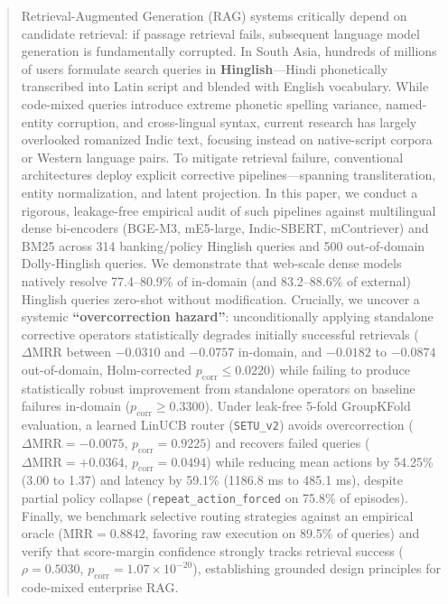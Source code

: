 \documentclass[conference]{IEEEtran}
\begin{document}
\begin{abstract}
Retrieval-Augmented Generation (RAG) systems critically depend on candidate retrieval: if passage retrieval fails, subsequent language model generation is fundamentally corrupted. In South Asia, hundreds of millions of users formulate search queries in \textbf{Hinglish}---Hindi phonetically transcribed into Latin script and blended with English vocabulary. While code-mixed queries introduce extreme phonetic spelling variance, named-entity corruption, and cross-lingual syntax, current research has largely overlooked romanized Indic text, focusing instead on native-script corpora or Western language pairs. To mitigate retrieval failure, conventional architectures deploy explicit corrective pipelines---spanning transliteration, entity normalization, and latent projection. In this paper, we conduct a rigorous, leakage-free empirical audit of such pipelines against multilingual dense bi-encoders (BGE-M3, mE5-large, Indic-SBERT, mContriever) and BM25 across 314 banking/policy Hinglish queries and 500 out-of-domain Dolly-Hinglish queries. We demonstrate that web-scale dense models natively resolve 77.4--80.9\% of in-domain (and 83.2--88.6\% of external) Hinglish queries zero-shot without modification. Crucially, we uncover a systemic \textbf{``overcorrection hazard''}: unconditionally applying standalone corrective operators statistically degrades initially successful retrievals ($\Delta\text{MRR}$ between $-0.0310$ and $-0.0757$ in-domain, and $-0.0182$ to $-0.0874$ out-of-domain, Holm-corrected $p_{\text{corr}} \le 0.0220$) while failing to produce statistically robust improvement from standalone operators on baseline failures in-domain ($p_{\text{corr}} \ge 0.3300$). Under leak-free 5-fold GroupKFold evaluation, a learned LinUCB router (\texttt{SETU\_v2}) avoids overcorrection ($\Delta\text{MRR} = -0.0075$, $p_{\text{corr}} = 0.9225$) and recovers failed queries ($\Delta\text{MRR} = +0.0364$, $p_{\text{corr}} = 0.0494$) while reducing mean actions by 54.25\% (3.00 to 1.37) and latency by 59.1\% (1186.8 ms to 485.1 ms), despite partial policy collapse (\texttt{repeat\_action\_forced} on 75.8\% of episodes). Finally, we benchmark selective routing strategies against an empirical oracle ($\text{MRR} = 0.8842$, favoring raw execution on 89.5\% of queries) and verify that score-margin confidence strongly tracks retrieval success ($\rho = 0.5030$, $p_{\text{corr}} = 1.07 \times 10^{-20}$), establishing grounded design principles for code-mixed enterprise RAG.
\end{abstract}
\end{document}
